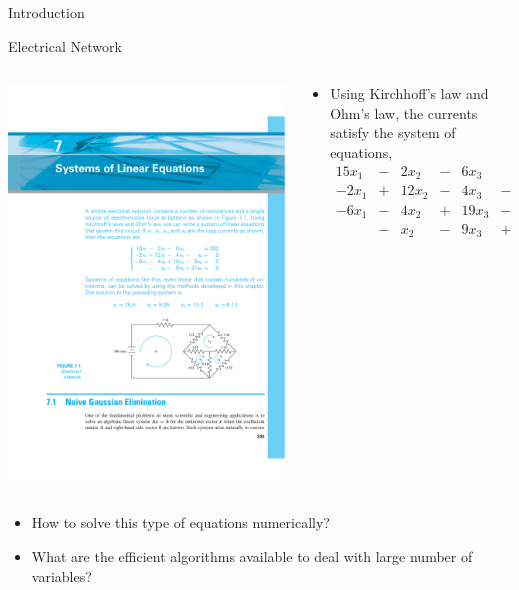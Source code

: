 \documentclass{beamer}
\begin{document}
\begin{frame}{Introduction}
\begin{block}{Electrical Network}
\begin{columns}
\begin{column}{0.35\textwidth}
\centerline{\includegraphics[width=\textwidth]{Lec10_fig1}}
\end{column}
\begin{column}{0.65\textwidth}
\begin{itemize}
\footnotesize
\item Using Kirchhoff's law and Ohm's law, the currents satisfy the system of equations,
\begin{align*}
15 x_1& -&2 x_2&-&6 x_3 && &=&300\\
-2x_1&+&12x_2&-&4x_3&-&x_4 &=&0\\
-6x_1&-&4x_2&+&19x_3&-&9x_4&=&0\\
&-&x_2&-&9x_3&+&21x_4 &=&0
\end{align*}
\normalsize
\end{itemize}
\end{column}
\end{columns}
\end{block}
\begin{itemize}
\item How to solve this type of equations \alert{numerically}? 
\item What are the \alert{efficient algorithms} available to deal with large number of variables? 
\end{itemize}
\end{frame}
\end{document}
